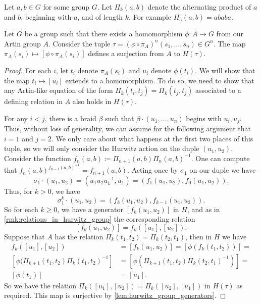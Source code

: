 Let $a,b \in G$ for some group  $G$.
Let $\Pi_k(a,b)$ denote the alternating product of $a$ and  $b$, beginning with $a$, and of length  $k$.
For example  $\Pi_5(a,b)=ababa$.
\begin{lemma}
	\label{lem:artin_to_hurwitz_surjection}
	Let $G$ be a group such that there exists a homomorphism $\phi \colon A \to G$ from our Artin group $A$.
	Consider the tuple $\tau = (\phi \circ \pi_A)^n(s_1,\ldots,s_n) \in G^n$.
	The map $\pi_A(s_i) \mapsto [\phi\circ\pi_A(s_i)]$ defines a surjection from $A$ to $H(\tau)$.
\end{lemma}
\begin{proof}
	For each $i$, let $t_i$ denote  $\pi_A(s_i)$ and  $u_i$ denote  $\phi(t_i)$.
	We will show that the map $t_i \mapsto [u_i]$ extends to a homomorphism.
	To do so, we need to show that any Artin-like equation of the form $\Pi_k(t_i,t_j) = \Pi_k(t_j,t_j)$ associated to a defining relation in $A$ also holds in $H(\tau)$.

	For any $i < j$, there is a braid $\beta$ such that  $\beta \cdot (u_1,\ldots,u_n)$ begins with $u_i,u_j$.
	Thus, without loss of generality, we can assume for the following argument that $i=1$ and  $j=2$.
	We only care about what happens at the first two places of this tuple, so we will only consider the Hurwitz action on the duple $(u_1,u_2)$.
	Consider the function $f_n(a,b) \coloneq \Pi_{n+1}(a,b)\Pi_n(a,b)^{-1} $.
	One can compute that $f_n(a,b)^{f_{n-1}(a,b)^{-1}}=f_{n+1}(a,b)$.
	Acting once by $\sigma_1$ on our duple we have
	\[
		\sigma_1 \cdot (u_1,u_2) = (u_1u_2u_1^{-1},u_1) = (f_1(u_1,u_2),f_0(u_1,u_2))
		.\]
	Thus, for $k>0$, we have
	\[
		\sigma_1^k \cdot (u_1,u_2) = (f_{k}(u_1,u_2),f_{k-1}(u_1,u_2))
		.\]
	So for each $k \geq 0$, we have a generator $[f_k(u_1,u_2)]$ in $H$, and as in \cref{rmk:relations_in_hurwitz_group} the corresponding relation
	\[
		[f_k(u_1,u_2)]=f_k([u_1],[u_2])
		.\]
	Suppose that $A$ has the relation  $\Pi_k(t_1,t_2)=\Pi_k(t_2,t_1)$, then in $H$ we have
	\begin{align*}
		f_k([u_1],[u_2])                               & = [f_k(u_1,u_2)] =  [\phi(f_k(t_1,t_2))] =                     \\
		[\phi(\Pi_{k+1}(t_1,t_2)\Pi_{k}(t_1,t_2)^{-1}] & = [\phi\left(\Pi_{k+1}(t_1,t_2)\Pi_{k}(t_2,t_1)^{-1}\right)] = \\
		[\phi(t_1)]                                    & = [u_1]
		.\end{align*}
	So we have the relation $\Pi_{k}([u_1],[u_2]) = \Pi_k([u_2],[u_1])$ in $H(\tau)$ as required.
	This map is surjective by \cref{lem:hurwitz_group_generators}.
\end{proof}

